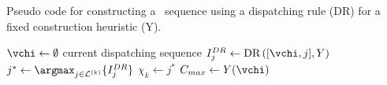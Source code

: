 \begin{algorithm}
    \caption{Pseudo code for constructing a \JSP\ sequence using a dispatching 
    rule (DR) for a fixed construction heuristic (Y).} 
    \label{pseudo:constructJSP}
    \begin{algorithmic}[1]
        \State $\vchi \gets \emptyset$ current dispatching sequence  
        \State $I_j^{DR}\leftarrow \text{DR}\left([\vchi,j],Y\right)$ 
        \EndFor
        \State $j^* \gets \argmax_{j\in \mathcal{L}^{(k)}}\{I_j^{DR}\}$ 
        \State $\chi_k \gets j^*$ 
        \EndFor
        \State \Return $C_{max} \gets Y(\vchi)$ 
        \EndProcedure
    \end{algorithmic}
\end{algorithm}